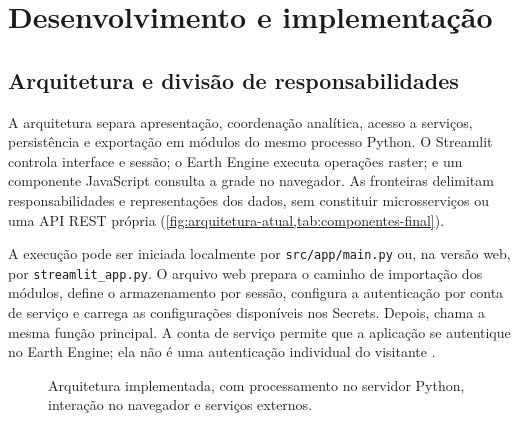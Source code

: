 \section{Desenvolvimento e implementação}\label{chap:implementacao-final}

\subsection{Arquitetura e divisão de responsabilidades}

A arquitetura separa apresentação, coordenação analítica, acesso a serviços, persistência e exportação em módulos do mesmo processo Python. O Streamlit controla interface e sessão; o Earth Engine executa operações raster; e um componente JavaScript consulta a grade no navegador. As fronteiras delimitam responsabilidades e representações dos dados, sem constituir microsserviços ou uma API REST própria (\cref{fig:arquitetura-atual,tab:componentes-final}).

A execução pode ser iniciada localmente por \texttt{src/app/main.py} ou, na versão web, por \texttt{streamlit\_app.py}. O arquivo web prepara o caminho de importação dos módulos, define o armazenamento por sessão, configura a autenticação por conta de serviço e carrega as configurações disponíveis nos Secrets. Depois, chama a mesma função principal. A conta de serviço permite que a aplicação se autentique no Earth Engine; ela não é uma autenticação individual do visitante \citep{GOOGLE_EE_SERVICE_ACCOUNT,STREAMLIT_CLOUD_SECRETS}.

\begin{figure}[htbp]
\centering
\resizebox{0.96\textwidth}{!}{}
\caption{Arquitetura implementada, com processamento no servidor Python, interação no navegador e serviços externos.}
\label{fig:arquitetura-atual}
\end{figure}

